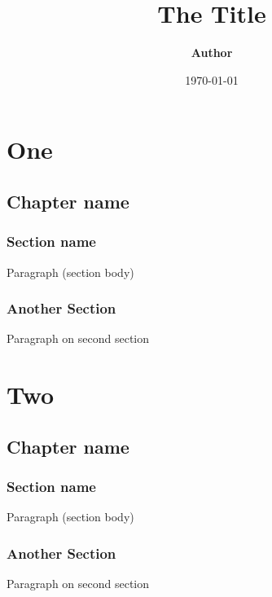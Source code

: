\documentclass{report}
\author{\Large \bfseries Author}
\title{\Large The Title}
\date{\today}
\begin{document}
\maketitle

\part{One}

\chapter{Chapter name}

\section{\LARGE Section name}
\Large Paragraph (section body)

\section{\LARGE Another Section}
\Large Paragraph on second section

\part{Two}

\chapter{Chapter name}

\section{\LARGE Section name}
\Large Paragraph (section body)

\section{\LARGE Another Section}
\Large Paragraph on second section
\end{document}

